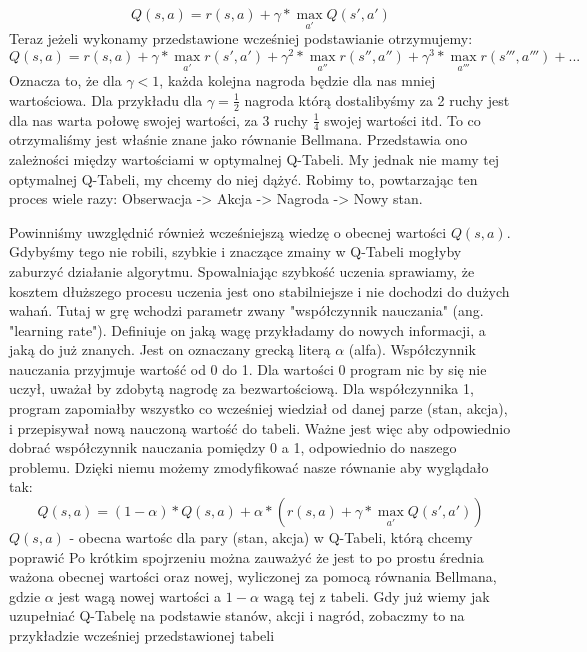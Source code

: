 \documentclass[a4paper,12pt]{article}
\begin{document}
\[ Q(s, a) =  r(s, a) + \gamma * \max_{a'}Q(s', a')\]
\newline Teraz jeżeli wykonamy przedstawione wcześniej podstawianie otrzymujemy:
\[ Q(s, a) =  r(s, a) + \gamma * \max_{a'}r(s', a') + \gamma ^ 2 * \max_{a''}r(s'', a'') + \gamma ^ 3 * \max_{a'''}r(s''', a''') + ...\]
Oznacza to, że dla \(\gamma < 1\), każda kolejna nagroda będzie dla nas mniej wartościowa. Dla przykładu dla \(\gamma = \frac{1}{2}\) nagroda którą dostalibyśmy za 2 ruchy jest dla nas warta połowę swojej wartości, za 3 ruchy  \(\frac{1}{4}\) swojej wartości itd. 
\newline \newline To co otrzymaliśmy jest właśnie znane jako równanie Bellmana. Przedstawia ono zależności między wartościami w optymalnej Q-Tabeli. My jednak nie mamy tej optymalnej Q-Tabeli, my chcemy do niej dążyć. Robimy to, powtarzając ten proces wiele razy: Obserwacja -> Akcja -> Nagroda -> Nowy stan. 

Powinniśmy uwzględnić również wcześniejszą wiedzę o obecnej wartości \(Q(s, a)\). Gdybyśmy tego nie robili, szybkie i znaczące zmainy w Q-Tabeli mogłyby zaburzyć działanie algorytmu. Spowalniając szybkość uczenia sprawiamy, że kosztem dłuższego procesu uczenia jest ono stabilniejsze i nie dochodzi do dużych wahań. Tutaj w grę wchodzi parametr zwany "współczynnik nauczania" (ang. "learning rate"). Definiuje on jaką wagę przykładamy do nowych informacji, a jaką do już znanych. Jest on oznaczany grecką literą $\alpha$ (alfa). Współczynnik nauczania przyjmuje wartość od 0 do 1. Dla wartości 0 program nic by się nie uczył, uważał by zdobytą nagrodę za bezwartościową. Dla współczynnika 1, program zapomiałby wszystko co wcześniej wiedział od danej parze (stan, akcja), i przepisywał nową nauczoną wartość do tabeli. Ważne jest więc aby odpowiednio dobrać współczynnik nauczania pomiędzy 0 a 1, odpowiednio do naszego problemu. Dzięki niemu możemy zmodyfikować nasze równanie aby wyglądało tak:
\[ Q(s, a) =  (1 - \alpha )*Q(s, a) + \alpha * ( r(s, a) + \gamma * \max_{a'}Q(s', a') )\]
\(Q(s, a)\) - obecna wartośc dla pary (stan, akcja) w Q-Tabeli, którą chcemy poprawić \newline
\newline Po krótkim spojrzeniu można zauważyć że jest to po prostu średnia ważona obecnej wartości oraz nowej, wyliczonej za pomocą równania Bellmana, gdzie \(\alpha\) jest wagą nowej wartości a \(1-\alpha\) wagą tej z tabeli.
\newline \newline Gdy już wiemy jak uzupełniać Q-Tabelę na podstawie stanów, akcji i nagród, zobaczmy to na przykładzie wcześniej przedstawionej tabeli
\end{document}
